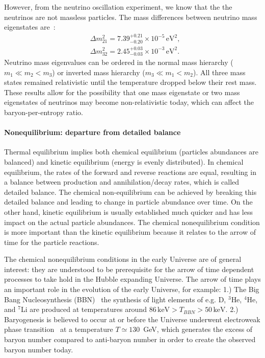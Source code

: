 However, from the neutrino oscillation experiment, we know that the the neutrinos are not massless particles. 
The mass differences between neutrino mass eigenstates are~\cite{ParticleDataGroup:2022pth}:
\begin{align}
&\Delta{m}_{21}^2=7.39^{+0.21}_{-0.20}\times10^{-5}\,\mathrm{eV}^2,\\
&\Delta{m}_{32}^2=2.45^{+0.03}_{-0.03}\times10^{-3}\,\mathrm{eV}^2.
\end{align}
Neutrino mass eigenvalues can be ordered in the normal mass hierarchy ($m_1\ll m_2<m_3$) or inverted mass hierarchy ($m_3\ll m_1<m_2$). All three mass states remained relativistic until the temperature dropped below their rest mass. These results allow for the possibility that one mass eigenstate or two mass eigenstates of neutrinos may become non-relativistic today, which can affect the baryon-per-entropy ratio.







\paragraph{Nonequilibrium: departure from detailed balance}
Thermal equilibrium implies both chemical equilibrium (particles abundances are balanced) and kinetic equilibrium (energy is evenly distributed). In chemical equilibrium, the rates of the forward and reverse reactions are equal, resulting in a balance between production and annihilation/decay rates, which is called detailed balance. The chemical non-equilibrium can be achieved by breaking this detailed balance and leading to change in particle abundance over time. On the other hand, kinetic equilibrium is usually established much quicker and has less impact on the actual particle abundances.
The chemical nonequilibrium condition is more important than the kinetic equilibrium because it relates to the arrow of time for the particle reactions. 

The chemical nonequilibrium conditions in the early Universe are of general interest: they are understood to be prerequisite for the arrow of time dependent processes to take hold in the Hubble expanding Universe. The arrow of time plays an important role in the evolution of the early Universe, for example:
 1.) The Big Bang Nucleosynthesis (BBN)~\cite{Pitrou:2018cgg,Kolb:1990vq,Dodelson:2003ft,Mukhanov:2005sc}  the synthesis of light elements of  e.g. D, $^3$He, $^4$He, and $^7$Li are produced at temperatures around $86\,\mathrm{keV}>T_{BBN}>50\,\mathrm{keV}$. 
 2.) Baryogenesis is believed to occur at or before the Universe underwent electroweak phase transition~\cite{Kolb:1990vq} at a temperature $T\simeq 130$\, GeV, which generates the excess of baryon number compared to anti-baryon number in order to create the observed baryon number today.

